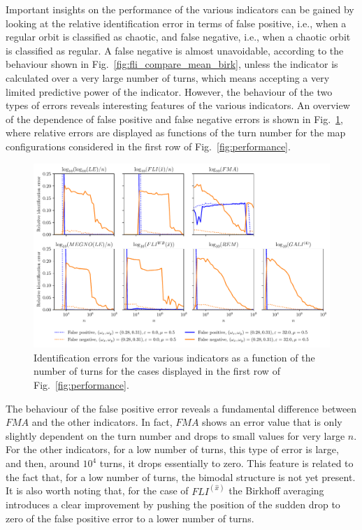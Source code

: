 Important insights on the performance of the various indicators can be gained by looking at the relative identification error in terms of false positive, i.e., when a regular orbit is classified as chaotic, and false negative, i.e., when a chaotic orbit is classified as regular. A false negative is almost unavoidable, according to the behaviour shown in Fig.~\ref{fig:fli_compare_mean_birk}, unless the indicator is calculated over a very large number of turns, which means accepting a very limited predictive power of the indicator. However, the behaviour of the two types of errors reveals interesting features of the various indicators. An overview of the dependence of false positive and false negative errors is shown in Fig.~\ref{fig:error_comparison}, where relative errors are displayed as functions of the turn number for the map configurations considered in the first row of Fig.~\ref{fig:performance}. 
%
\begin{figure}[htp]
    \centering
    \includegraphics[width=\textwidth]{6_dynamic_indicators/fig/corrected_figs/performance_specific_1_3.pdf}
    \caption{Identification errors for the various indicators as a function of the number of turns for the cases displayed in the first row of Fig.~\ref{fig:performance}.}
    \label{fig:error_comparison}
\end{figure}
%

The behaviour of the false positive error reveals a fundamental difference between $FMA$ and the other indicators. In fact, $FMA$ shows an error value that is only slightly dependent on the turn number and drops to small values for very large $n$. For the other indicators, for a low number of turns, this type of error is large, and then, around $10^4$ turns, it drops essentially to zero. This feature is related to the fact that, for a low number of turns, the bimodal structure is not yet present. It is also worth noting that, for the case of $FLI^(\hat{{x}})$ the Birkhoff averaging introduces a clear improvement by pushing the position of the sudden drop to zero of the false positive error to a lower number of turns.

